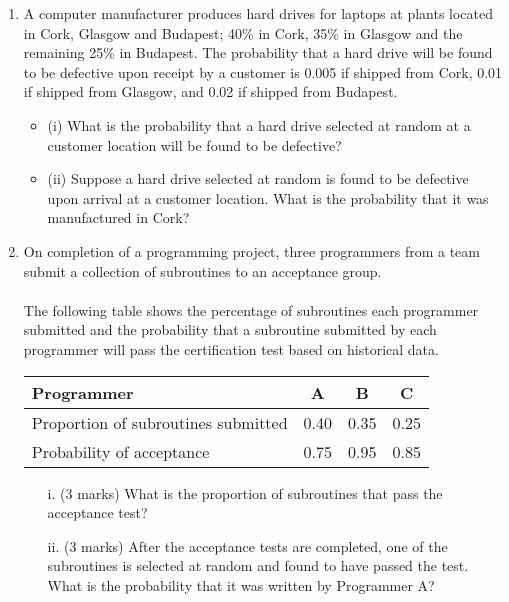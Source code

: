 \documentclass[a4paper,12pt]{article}
\begin{document}
\begin{enumerate}
\item 

A computer manufacturer produces hard drives for laptops at plants located in Cork, Glasgow and Budapest; 40\% in Cork, 35\% in Glasgow and the remaining 25\% in Budapest. The probability that a hard drive will be found to be defective upon receipt by a customer is 0.005 if shipped from Cork, 0.01 if shipped from Glasgow, and 0.02 if shipped from Budapest.

\begin{itemize}
	\item (i)	What is the probability that a hard drive selected at random at a customer location will be found to be defective?
	\item (ii)	Suppose a hard drive selected at random is found to be defective upon arrival at a customer location. What is the probability that it was manufactured in Cork?
\end{itemize}
\item
	On completion of a programming project, three programmers from a team submit a collection of subroutines to an acceptance group. \\
	\\
	The following table shows the percentage of subroutines each programmer submitted and the probability that a subroutine submitted by each programmer will pass the certification test based on historical data.
	
	\begin{center}
		\begin{tabular}{|l|c|c|c|}
			\hline
			Programmer &	A	&B	& C	\\\hline
			Proportion of subroutines submitted&	0.40	&0.35	&0.25	\\ \hline
			Probability of acceptance	&0.75	&0.95	&0.85\\
			
			\hline
		\end{tabular}
	\end{center}

\begin{itemize}
	\item[i.] (3 marks) What is the proportion of subroutines that pass the acceptance test?
	\item[ii.](3 marks)  After the acceptance tests are completed, one of the subroutines is selected at random and found to have passed the test. What is the probability that it was written by Programmer A?
\end{itemize}




\end{enumerate}
\end{document}
